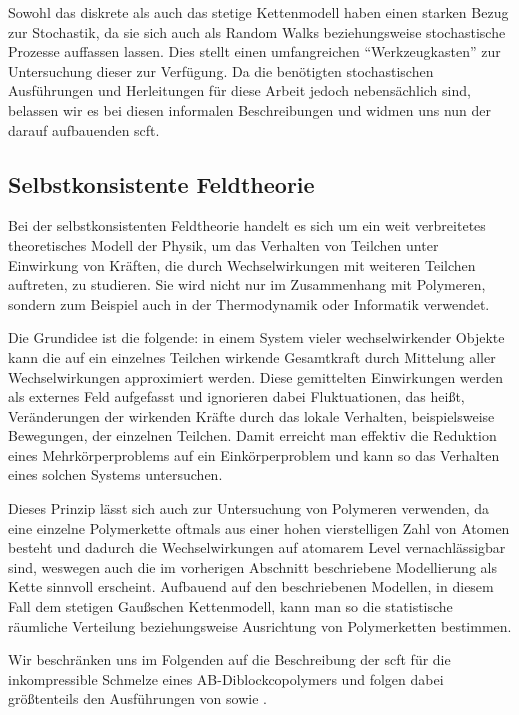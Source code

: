 Sowohl das diskrete als auch das stetige Kettenmodell haben einen starken Bezug zur Stochastik, da sie sich auch als Random Walks beziehungsweise stochastische Prozesse auffassen lassen.
Dies stellt einen umfangreichen \enquote{Werkzeugkasten} zur Untersuchung dieser zur Verfügung.
Da die benötigten stochastischen Ausführungen und Herleitungen für diese Arbeit jedoch nebensächlich sind, belassen wir es bei diesen informalen Beschreibungen und widmen uns nun der darauf aufbauenden \ac{scft}.


\subsection*{Selbstkonsistente Feldtheorie} %

Bei der selbstkonsistenten Feldtheorie handelt es sich um ein weit verbreitetes theoretisches Modell der Physik, um das Verhalten von Teilchen unter Einwirkung von Kräften, die durch Wechselwirkungen mit weiteren Teilchen auftreten, zu studieren.
Sie wird nicht nur im Zusammenhang mit Polymeren, sondern zum Beispiel auch in der Thermodynamik oder Informatik verwendet.

Die Grundidee ist die folgende: in einem System vieler wechselwirkender Objekte kann die auf ein einzelnes Teilchen wirkende Gesamtkraft durch Mittelung aller Wechselwirkungen approximiert werden.
Diese gemittelten Einwirkungen werden als externes Feld aufgefasst und ignorieren dabei Fluktuationen, das heißt, Veränderungen der wirkenden Kräfte durch das lokale Verhalten, beispielsweise Bewegungen, der einzelnen Teilchen.
Damit erreicht man effektiv die Reduktion eines Mehrkörperproblems auf ein Einkörperproblem und kann so das Verhalten eines solchen Systems untersuchen.

Dieses Prinzip lässt sich auch zur Untersuchung von Polymeren verwenden,
da eine einzelne Polymerkette oftmals aus einer hohen vierstelligen Zahl von Atomen besteht und dadurch die Wechselwirkungen auf atomarem Level vernachlässigbar sind, weswegen auch die im vorherigen Abschnitt beschriebene Modellierung als Kette sinnvoll erscheint.
Aufbauend auf den beschriebenen Modellen, in diesem Fall dem stetigen Gaußschen Kettenmodell, kann man so die statistische räumliche Verteilung beziehungsweise Ausrichtung von Polymerketten bestimmen.

Wir beschränken uns im Folgenden auf die Beschreibung der \ac{scft} für die inkompressible Schmelze eines AB-Diblockcopolymers und folgen dabei größtenteils den Ausführungen von \textcite{Matsen:1994bz} sowie \textcite{Stasiak:2011ba}.

